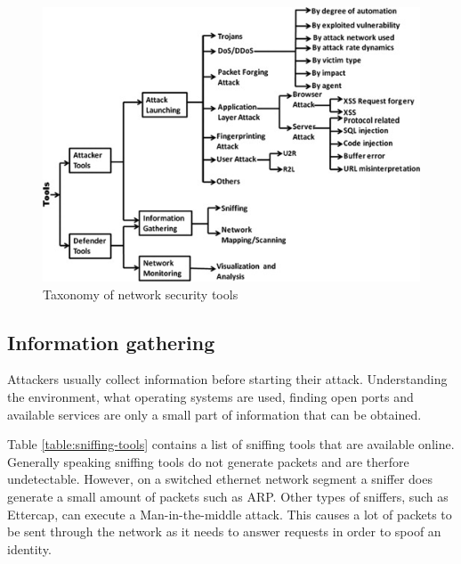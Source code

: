 \documentclass[conference]{IEEEtran}
\begin{document}
\begin{figure}[htbp]  
\centerline{\includegraphics[scale=.65]{network-tools.jpg}}
\caption{Taxonomy of network security tools \cite{b1}}
\end{figure}

\subsection{Information gathering}
Attackers usually collect information before starting their attack. Understanding the environment, what operating systems are used, finding open ports and available services are only a small part of information that can be obtained. 

\smallskip Table \ref{table:sniffing-tools} contains a list of sniffing tools that are available online. Generally speaking sniffing tools do not generate packets and are therfore undetectable. However, on a switched ethernet network segment a sniffer does generate a small amount of packets such as ARP\cite{b9}. Other types of sniffers, such as Ettercap, can execute a Man-in-the-middle attack. This causes a lot of packets to be sent through the network as it needs to answer requests in order to spoof an identity.
\end{document}
